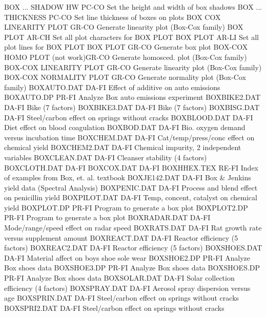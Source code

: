 BOX ... SHADOW HW           PC-CO Set the height and width of box shadows
BOX ... THICKNESS           PC-CO Set line thickness of boxes on plots
BOX COX LINEARITY PLOT      GR-CO Generate linearity plot (Box-Cox family)
BOX PLOT                    AR-CH Set all plot characters for BOX PLOT
BOX PLOT                    AR-LI Set all plot lines for BOX PLOT
BOX PLOT                    GR-CO Generate box plot
BOX-COX HOMO PLOT (not work)GR-CO Generate homosced. plot (Box-Cox family)
BOX-COX LINEARITY PLOT      GR-CO Generate linearity plot (Box-Cox family)
BOX-COX NORMALITY PLOT      GR-CO Generate normality plot (Box-Cox family)
BOXAUTO.DAT                 DA-FI Effect of additive on auto emissions 
BOXAUTO.DP                  PR-FI Analyze Box auto emissions experiment
BOXBIKE2.DAT                DA-FI Bike (7 factors)
BOXBIKE3.DAT                DA-FI Bike (7 factors)
BOXBISG.DAT                 DA-FI Steel/carbon effect on springs without cracks
BOXBLOOD.DAT                DA-FI Diet effect on blood coagulation
BOXBOD.DAT                  DA-FI Bio. oxygen demand versus incubation time
BOXCHEM.DAT                 DA-FI Cat/temp/press/conc effect on chemical yield
BOXCHEM2.DAT                DA-FI Chemical impurity, 2 independent variables
BOXCLEAN.DAT                DA-FI Cleanser stability (4 factors)
BOXCLOTH.DAT                DA-FI 
BOXCOX.DAT                  DA-FI
BOXHHEX.TEX                 RE-FI Index of examples from Box, et. al. textbook
BOXJE142.DAT                DA-FI Box & Jenkins yield data (Spectral Analysis)
BOXPENIC.DAT                DA-FI Process and blend effect on penicillin yield
BOXPILOT.DAT                DA-FI Temp, concent, catalyst on chemical yield
BOXPLOT.DP                  PR-FI Program to generate a box plot
BOXPLOT2.DP                 PR-FI Program to generate a box plot
BOXRADAR.DAT                DA-FI Mode/range/speed effect on radar speed
BOXRATS.DAT                 DA-FI Rat growth rate versus supplement amount
BOXREACT.DAT                DA-FI Reactor efficiency (5 factors)
BOXREAC2.DAT                DA-FI Reactor efficiency (5 factors)
BOXSHOES.DAT                DA-FI Material affect on boys shoe sole wear
BOXSHOE2.DP                 PR-FI Analyze Box shoes data 
BOXSHOE3.DP                 PR-FI Analyze Box shoes data
BOXSHOES.DP                 PR-FI Analyze Box shoes data
BOXSOLAR.DAT                DA-FI Solar collection efficiency (4 factors)
BOXSPRAY.DAT                DA-FI Aerosol spray dispersion versus age
BOXSPRIN.DAT                DA-FI Steel/carbon effect on springs without cracks
BOXSPRI2.DAT                DA-FI Steel/carbon effect on springs without cracks
